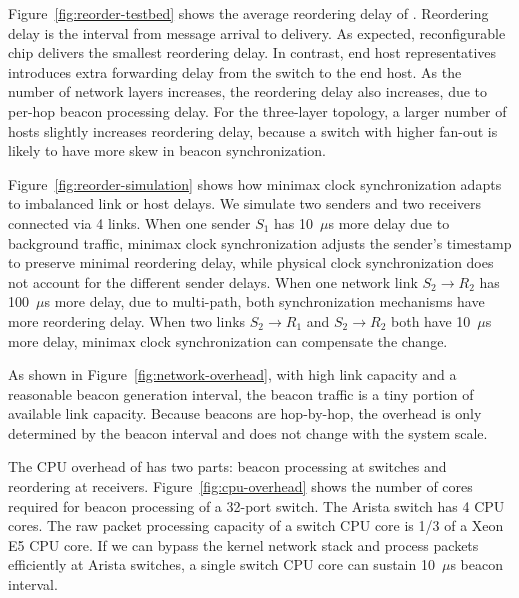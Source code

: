 Figure~\ref{fig:reorder-testbed} shows the average reordering delay of \sys.
Reordering delay is the interval from message arrival to delivery. As expected, reconfigurable chip delivers the smallest reordering delay. In contrast, end host representatives introduces extra forwarding delay from the switch to the end host. As the number of network layers increases, the reordering delay also increases, due to per-hop beacon processing delay.
For the three-layer topology, a larger number of hosts slightly increases reordering delay, because a switch with higher fan-out is likely to have more skew in beacon synchronization.

Figure~\ref{fig:reorder-simulation} shows how minimax clock synchronization adapts to imbalanced link or host delays. We simulate two senders and two receivers connected via 4 links. When one sender $S_1$ has 10~$\mu$s more delay due to background traffic, minimax clock synchronization adjusts the sender's timestamp to preserve minimal reordering delay, while physical clock synchronization does not account for the different sender delays. When one network link $S_2 \rightarrow R_2$ has 100~$\mu$s more delay, due to multi-path, both synchronization mechanisms have more reordering delay. When two links $S_2 \rightarrow R_1$ and $S_2 \rightarrow R_2$ both have 10~$\mu$s more delay, minimax clock synchronization can compensate the change.






As shown in Figure~\ref{fig:network-overhead}, with high link capacity and a reasonable beacon generation interval, the beacon traffic is a tiny portion of available link capacity. Because beacons are hop-by-hop, the overhead is only determined by the beacon interval and does not change with the system scale.

The CPU overhead of \sys has two parts: beacon processing at switches and reordering at receivers. Figure~\ref{fig:cpu-overhead} shows the number of cores required for beacon processing of a 32-port switch. The Arista switch has 4 CPU cores. The raw packet processing capacity of a switch CPU core is 1/3 of a Xeon E5 CPU core. If we can bypass the kernel network stack and process packets efficiently at Arista switches, a single switch CPU core can sustain 10~$\mu$s beacon interval.

